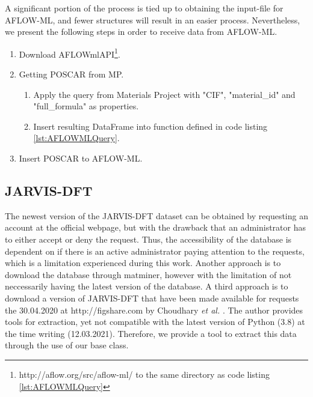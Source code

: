 A significant portion of the process is tied up to obtaining the input-file for AFLOW-ML, and fewer structures will result in an easier process. Nevertheless, we present the following steps in order to receive data from AFLOW-ML.

\begin{enumerate}
  \item Download AFLOWmlAPI\footnote{http://aflow.org/src/aflow-ml/ to the same directory as code listing \ref{lst:AFLOWMLQuery}}.
  \item Getting POSCAR from MP.
  \begin{enumerate}
    \item Apply the query from Materials Project with "CIF", "material\_id" and "full\_formula" as properties.
    \item Insert resulting DataFrame into function defined in code listing \ref{lst:AFLOWMLQuery}.
  \end{enumerate}
    \item Insert POSCAR to AFLOW-ML.
\end{enumerate}


\subsection{JARVIS-DFT}

The newest version of the JARVIS-DFT dataset can be obtained by requesting an account at the official webpage, but with the drawback that an administrator has to either accept or deny the request. Thus, the accessibility of the database is dependent on if there is an active administrator paying attention to the requests, which is a limitation experienced during this work. Another approach is to download the database through matminer, however with the limitation of not neccessarily having the latest version of the database. A third approach is to download a version of JARVIS-DFT that have been made available for requests the 30.04.2020 at http://figshare.com by Choudhary \textit{et al.} \cite{Choudhary2020}. The author provides tools for extraction, yet not compatible with the latest version of Python (3.8) at the time writing (12.03.2021). Therefore, we provide a tool to extract this data through the use of our base class.

